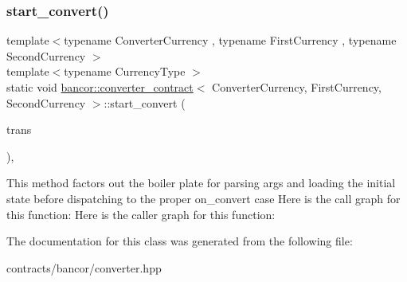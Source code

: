 \subsubsection{\texorpdfstring{start\+\_\+convert()}{start\_convert()}}
{\footnotesize\ttfamily template$<$typename Converter\+Currency , typename First\+Currency , typename Second\+Currency $>$ \\
template$<$typename Currency\+Type $>$ \\
static void \mbox{\hyperlink{classbancor_1_1converter__contract}{bancor\+::converter\+\_\+contract}}$<$ Converter\+Currency, First\+Currency, Second\+Currency $>$\+::start\+\_\+convert (\begin{DoxyParamCaption}\item[{const typename Currency\+Type\+::transfer\+\_\+memo \&}]{trans }\end{DoxyParamCaption})\hspace{0.3cm}{\ttfamily [inline]}, {\ttfamily [static]}}

This method factors out the boiler plate for parsing args and loading the initial state before dispatching to the proper on\+\_\+convert case Here is the call graph for this function\+:
Here is the caller graph for this function\+:


The documentation for this class was generated from the following file\+:\begin{DoxyCompactItemize}
\item 
contracts/bancor/converter.\+hpp\end{DoxyCompactItemize}
